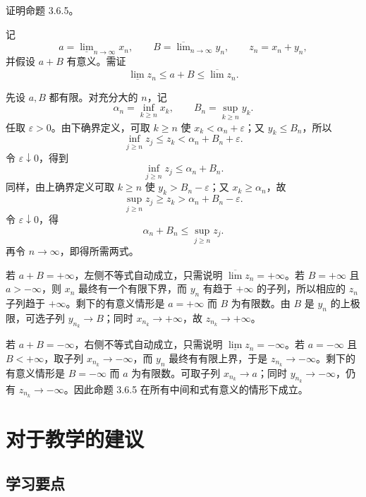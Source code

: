 \begin{xexercise}[11]
证明命题 3.6.5。
\end{xexercise}
\begin{xsolution}
记
\[
  a=\underline{\lim}_{n\to\infty}x_n,
  \qquad
  B=\overline{\lim}_{n\to\infty}y_n,
  \qquad
  z_n=x_n+y_n,
\]
并假设 $a+B$ 有意义。需证
\[
  \underline{\lim}z_n\leqslant a+B\leqslant\overline{\lim}z_n.
\]

先设 $a,B$ 都有限。对充分大的 $n$，记
\[
  \alpha_n=\inf_{k\geqslant n}x_k,
  \qquad
  B_n=\sup_{k\geqslant n}y_k.
\]
任取 $\varepsilon>0$。由下确界定义，可取 $k\geqslant n$ 使 $x_k<\alpha_n+\varepsilon$；又 $y_k\leqslant B_n$，所以
\[
  \inf_{j\geqslant n}z_j
  \leqslant z_k<\alpha_n+B_n+\varepsilon.
\]
令 $\varepsilon\downarrow0$，得到
\[
  \inf_{j\geqslant n}z_j\leqslant\alpha_n+B_n.
\]
同样，由上确界定义可取 $k\geqslant n$ 使 $y_k>B_n-\varepsilon$；又 $x_k\geqslant\alpha_n$，故
\[
  \sup_{j\geqslant n}z_j
  \geqslant z_k>\alpha_n+B_n-\varepsilon.
\]
令 $\varepsilon\downarrow0$，得
\[
  \alpha_n+B_n\leqslant\sup_{j\geqslant n}z_j.
\]
再令 $n\to\infty$，即得所需两式。

若 $a+B=+\infty$，左侧不等式自动成立，只需说明 $\overline{\lim}z_n=+\infty$。若 $B=+\infty$ 且 $a>-\infty$，则 $x_n$ 最终有一个有限下界，而 $y_n$ 有趋于 $+\infty$ 的子列，所以相应的 $z_n$ 子列趋于 $+\infty$。剩下的有意义情形是 $a=+\infty$ 而 $B$ 为有限数。由 $B$ 是 $y_n$ 的上极限，可选子列 $y_{n_k}\to B$；同时 $x_{n_k}\to+\infty$，故 $z_{n_k}\to+\infty$。

若 $a+B=-\infty$，右侧不等式自动成立，只需说明 $\underline{\lim}z_n=-\infty$。若 $a=-\infty$ 且 $B<+\infty$，取子列 $x_{n_k}\to-\infty$，而 $y_n$ 最终有有限上界，于是 $z_{n_k}\to-\infty$。剩下的有意义情形是 $B=-\infty$ 而 $a$ 为有限数。可取子列 $x_{n_k}\to a$；同时 $y_{n_k}\to-\infty$，仍有 $z_{n_k}\to-\infty$。因此命题 3.6.5 在所有中间和式有意义的情形下成立。
\end{xsolution}


\section{对于教学的建议}

\subsection{学习要点}

